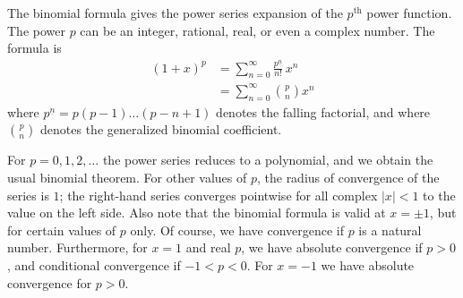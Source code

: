 \documentclass[12pt]{article}
\newcommand{\supth}{^{\text{th}}}
\begin{document}
The binomial formula gives the power series expansion of the
$p\supth$ power function. The power $p$ can be an integer,
rational, real, or even a complex number.  The formula is
\begin{align*}
  (1+x)^p &= \sum_{n=0}^\infty  \frac{p^{\underline{n}}}{n!} \, x^n\\
          &=  \sum_{n=0}^\infty  \binom{p}{n} x^n
\end{align*}
where $p^{\underline{n}}= p(p-1)\ldots (p-n+1)$ denotes the falling
factorial, and where $\binom{p}{n}$ denotes the generalized binomial
coefficient.  

For $p=0,1,2,\ldots$ the power series reduces to a polynomial, and we
obtain the usual binomial theorem.  For other values of $p$, the
radius of convergence of the series is $1$; the right-hand series
converges pointwise for all complex $|x|<1$ to the value on the left
side.  Also note that the binomial formula is valid at $x=\pm 1$, but
for certain values of $p$ only.  Of course, we have convergence if $p$
is a natural number.  Furthermore, for $x=1$ and real $p$, we have
absolute convergence if $p>0$, and conditional convergence if
$-1<p<0$.  For $x=-1$ we have absolute convergence for $p>0$.
\end{document}
